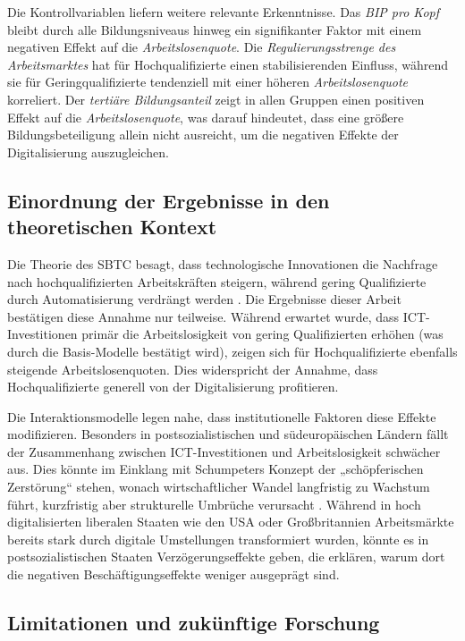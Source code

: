 Die Kontrollvariablen liefern weitere relevante Erkenntnisse. Das 
\textit{\ac{BIP} pro Kopf} bleibt durch alle Bildungsniveaus hinweg ein signifikanter 
Faktor mit einem negativen Effekt auf die \textit{Arbeitslosenquote}. Die 
\textit{Regulierungsstrenge des Arbeitsmarktes} hat für Hochqualifizierte einen 
stabilisierenden Einfluss, während sie für Geringqualifizierte tendenziell mit einer 
höheren \textit{Arbeitslosenquote} korreliert. Der \textit{tertiäre Bildungsanteil} zeigt 
in allen Gruppen einen positiven Effekt auf die \textit{Arbeitslosenquote}, was darauf 
hindeutet, dass eine größere Bildungsbeteiligung allein nicht ausreicht, um die negativen 
Effekte der Digitalisierung auszugleichen.

\subsection{Einordnung der Ergebnisse in den theoretischen Kontext}

Die Theorie des \ac{SBTC} besagt, dass technologische Innovationen die Nachfrage nach 
hochqualifizierten Arbeitskräften steigern, während gering Qualifizierte durch 
Automatisierung verdrängt werden \parencite[vgl.][S. 7]{acemoglu2002technical}. Die 
Ergebnisse dieser Arbeit bestätigen diese Annahme nur teilweise. Während erwartet wurde, 
dass \ac{ICT}-Investitionen primär die Arbeitslosigkeit von gering Qualifizierten erhöhen 
(was durch die Basis-Modelle bestätigt wird), zeigen sich für Hochqualifizierte ebenfalls 
steigende Arbeitslosenquoten. Dies widerspricht der Annahme, dass Hochqualifizierte 
generell von der Digitalisierung profitieren.

Die Interaktionsmodelle legen nahe, dass institutionelle Faktoren diese Effekte 
modifizieren. Besonders in postsozialistischen und südeuropäischen Ländern fällt der 
Zusammenhang zwischen \ac{ICT}-Investitionen und Arbeitslosigkeit schwächer aus. Dies 
könnte im Einklang mit Schumpeters Konzept der „schöpferischen Zerstörung“ stehen, wonach 
wirtschaftlicher Wandel langfristig zu Wachstum führt, kurzfristig aber strukturelle 
Umbrüche verursacht \parencite[vgl.][S. 103-105]{schumpeter1976capitalism}. Während in 
hoch digitalisierten liberalen Staaten wie den USA oder Großbritannien Arbeitsmärkte 
bereits stark durch digitale Umstellungen transformiert wurden, könnte es in 
postsozialistischen Staaten Verzögerungseffekte geben, die erklären, warum dort die 
negativen Beschäftigungseffekte weniger ausgeprägt sind.

\subsection{Limitationen und zukünftige Forschung}

